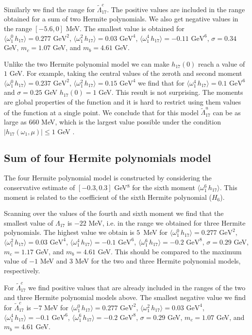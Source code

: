 Similarly we find the range for $\tilde\Lambda_{17}^c$. The positive values are included in the range obtained for a sum of two Hermite polynomials. We also get negative values in the range $[-5.6,0]$ MeV. The smallest value is obtained for $\langle\omega_1^0\,h_{17}\rangle=0.277\mbox{ GeV}^2$, $\langle\omega_1^2\,h_{17}\rangle=0.03\mbox{ GeV}^4$, $\langle\omega_1^4\,h_{17}\rangle=-0.11\mbox{ GeV}^6$, $\sigma=0.34$ GeV, $m_c=1.07$ GeV, and $m_b=4.61$ GeV. 


Unlike the two Hermite polynomial model we can make $h_{17}(0)$ reach a value of  $1$ GeV.  For example, taking the central values of the zeroth and second moment $\langle\omega_1^0\,h_{17}\rangle=0.237\mbox{ GeV}^2$, $\langle\omega_1^2\,h_{17}\rangle=0.15\mbox{ GeV}^4$ we find that for $\langle\omega_1^4\,h_{17}\rangle=0.1\mbox{ GeV}^6$ and $\sigma=0.25$ GeV $h_{17}(0)=1$ GeV. This result is not surprising. The moments are global properties of the function and it is hard to restrict using them values of the function at a single point. We conclude that for this model $\tilde\Lambda_{17}^u$ can be as large as 660 MeV, which is the largest value possible under the condition $|h_{17}(\omega_1,\mu)|\leq1$ GeV \cite{Gunawardana:2019gep}. 

\subsection{Sum of four Hermite polynomials model} 

The four Hermite polynomial model is constructed by considering the conservative estimate of $[-0.3,0.3]$ GeV$^8$ for the sixth moment $\langle\omega_1^6\,h_{17}\rangle$. This moment is related to the coefficient of the sixth Hermite polynomial ($H_6$).\par
Scanning over the values of the fourth and sixth moment we find that the smallest value of $\Lambda_{17}$ is $-22$ MeV, i.e. in the range we obtained for three Hermite polynomials. The highest value we obtain is  $5$~MeV for $\langle\omega_1^0\,h_{17}\rangle=0.277\mbox{ GeV}^2$, $\langle\omega_1^2\,h_{17}\rangle=0.03\mbox{ GeV}^4$, $\langle\omega_1^4\,h_{17}\rangle=-0.1\mbox{ GeV}^6$, $\langle\omega_1^6\,h_{17}\rangle=-0.2\mbox{ GeV}^8$, $\sigma=0.29$ GeV, $m_c=1.17$ GeV, and $m_b=4.61$ GeV. This should be compared to the maximum value of $-1$ MeV and $3$ MeV for the two and three Hermite polynomial models, respectively.   

For $\tilde\Lambda_{17}^c$ we find positive values that are already included in the ranges of the two and three Hermite polynomial models above. The smallest negative value we find for $\tilde\Lambda_{17}^c$ is $-7$ MeV for $\langle\omega_1^0\,h_{17}\rangle=0.277\mbox{ GeV}^2$, $\langle\omega_1^2\,h_{17}\rangle=0.03\mbox{ GeV}^4$, $\langle\omega_1^4\,h_{17}\rangle=-0.1\mbox{ GeV}^6$, $\langle\omega_1^6\,h_{17}\rangle=-0.2\mbox{ GeV}^8$, $\sigma=0.29$ GeV, $m_c=1.07$ GeV, and $m_b=4.61$ GeV.


